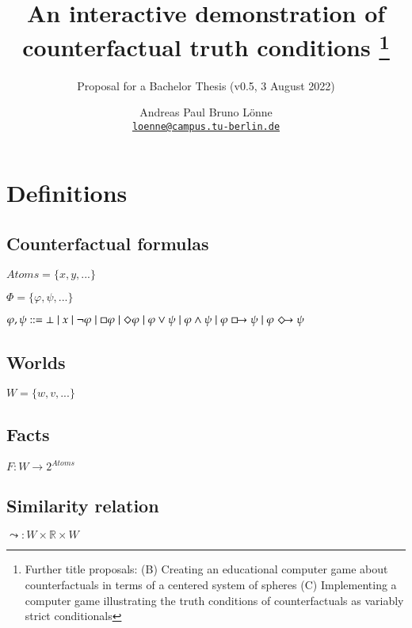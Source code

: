 \documentclass[a4paper,american]{paper}
\providecommand*{\code}[1]{\texttt{#1}}
\begin{document}
\title{An interactive demonstration of counterfactual truth conditions%
	\footnote{Further title proposals:
		(B) Creating an educational computer game about counterfactuals in terms of a centered system of spheres
		(C) Implementing a computer game illustrating the truth conditions of counterfactuals as variably strict conditionals
	}
}

\subtitle{Proposal for a Bachelor Thesis (v0.5, 3 August 2022)}

\author{%
	Andreas Paul Bruno Lönne\\
	\code{\href{mailto:loenne@campus.tu-berlin.de}{loenne@campus.tu-berlin.de}}
}


\maketitle

\section*{Definitions}
\subsection{Counterfactual formulas}
$Atoms = \{x,y,...\}$

$\Phi = \{\varphi, \psi,... \}$

$\varphi, \psi ::= \bot \mid x \mid \neg \varphi \mid \Box \varphi \mid \Diamond \varphi \mid \varphi \vee \psi \mid \varphi \wedge \psi \mid \varphi \boxright \psi \mid \varphi \Diamondright \psi$

\subsection{Worlds}
$W = \{w,v,...\}$

\subsection{Facts}
$F \colon W \rightarrow 2^{Atoms}$

\subsection{Similarity relation}
$\leadsto \colon W\times \mathbb{R} \times W$
\end{document}
